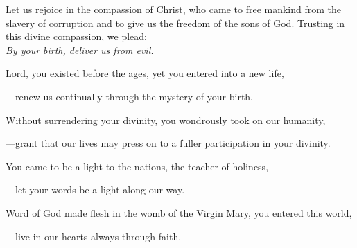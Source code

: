 \intercessions\indent

\begin{hangpar}

Let us rejoice in the compassion of Christ, who came to free mankind from the slavery of corruption and to give us the freedom of the sons of God. Trusting in this divine compassion, we plead:\\
\emph{By your birth, deliver us from evil.}

\medskip Lord, you existed before the ages, yet you entered into a new life,

{\color{red}---\thinspace}renew us continually through the mystery of your birth.

\medskip Without surrendering your divinity, you wondrously took on our humanity,

{\color{red}---\thinspace}grant that our lives may press on to a fuller participation in your divinity.

\medskip You came to be a light to the nations, the teacher of holiness,

{\color{red}---\thinspace}let your words be a light along our way.

\medskip Word of God made flesh in the womb of the Virgin Mary, you entered this world,

{\color{red}---\thinspace}live in our hearts always through faith.

\medskip

\end{hangpar}